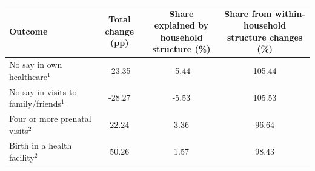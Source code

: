 \begin{tabular}{lccc}
\toprule
Outcome & \makecell{Total change\\(pp)} & \makecell{Share explained by \\household structure (\%)} & \makecell{Share from within-\\household structure changes (\%)} \\
\midrule
No say in own healthcare$^1$&-23.35&-5.44&105.44\\
No say in visits to family/friends$^1$&-28.27&-5.53&105.53\\
Four or more prenatal visits$^2$&22.24&3.36&96.64\\
Birth in a health facility$^2$&50.26&1.57&98.43\\
\bottomrule
\end{tabular}
